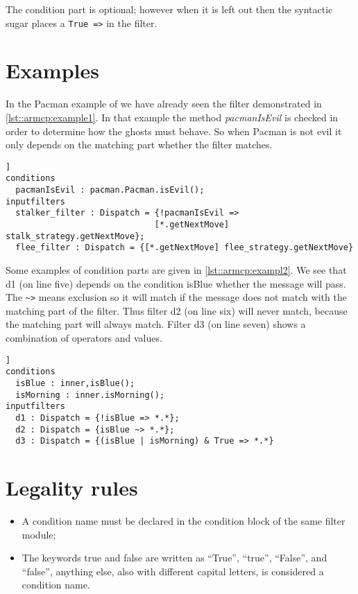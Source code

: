 The condition part is optional; however when it is left out then the syntactic sugar places a \lstinline|True =>|
in the filter.

\section*{Examples}
In the Pacman example of \cite{Composestar} we have already seen the filter demonstrated in \autoref{lst::armcp:example1}. In that example the method \emph{pacmanIsEvil}
is checked in order to determine how the ghosts must behave. So when Pacman is not evil it only depends on the matching part whether the filter matches.

\begin{lstlisting}[caption={The dymanic strategy filtermodule}, label=lst::armcp:example1,style=listing,language=Composestar,float=[tpb]]
conditions
  pacmanIsEvil : pacman.Pacman.isEvil();
inputfilters
  stalker_filter : Dispatch = {!pacmanIsEvil => 
                              [*.getNextMove] stalk_strategy.getNextMove};
  flee_filter : Dispatch = {[*.getNextMove] flee_strategy.getNextMove}
\end{lstlisting}

Some examples of condition parts are given in \autoref{lst::armcp:exampl2}. We see that d1 (on line five) depends on the condition isBlue whether the message will pass.
The \lstinline[language=Composestar]|~>| means exclusion so it will match if the message does not
match with the matching part of the filter. Thus
filter d2 (on line six) will never match, because the matching part will always match.
Filter d3 (on line seven) shows a combination of operators and values.

\begin{lstlisting}[caption={Possible condition parts}, label=lst::armcp:exampl2,style=listing,language=Composestar,float=[tpb]]
conditions
  isBlue : inner,isBlue();
  isMorning : inner.isMorning();
inputfilters
  d1 : Dispatch = {!isBlue => *.*};
  d2 : Dispatch = {isBlue ~> *.*};
  d3 : Dispatch = {(isBlue | isMorning) & True => *.*}
\end{lstlisting}

\section*{Legality rules}
\begin{itemize}[noitemsep]
\item A condition name must be declared in the condition block of the same filter module;
\item The keywords true and false are written as ``True'', ``true'', ``False'', and ``false'', anything else, also with different
capital letters, is considered a condition name.
\end{itemize}

